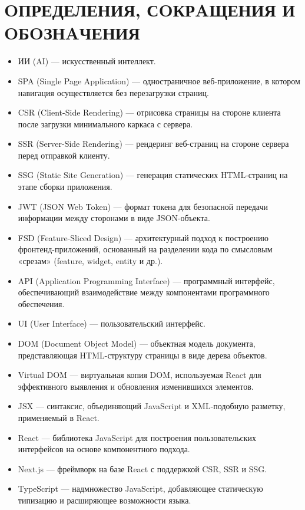\newpage
{}
\section*{OПРЕДЕЛЕНИЯ, СOКРAЩЕНИЯ И OБOЗНAЧЕНИЯ}

\begin{itemize}
  \item ИИ (AI) — искусственный интеллект.
  \item SPA (Single Page Application) — одностраничное веб-приложение, в котором навигация осуществляется без перезагрузки страниц.
  \item CSR (Client-Side Rendering) — отрисовка страницы на стороне клиента после загрузки минимального каркаса с сервера.
  \item SSR (Server-Side Rendering) — рендеринг веб-страниц на стороне сервера перед отправкой клиенту.
  \item SSG (Static Site Generation) — генерация статических HTML-страниц на этапе сборки приложения.
  \item JWT (JSON Web Token) — формат токена для безопасной передачи информации между сторонами в виде JSON-объекта.
  \item FSD (Feature-Sliced Design) — архитектурный подход к построению фронтенд-приложений, основанный на разделении кода по смысловым «срезам» (feature, widget, entity и др.).
  \item API (Application Programming Interface) — программный интерфейс, обеспечивающий взаимодействие между компонентами программного обеспечения.
  \item UI (User Interface) — пользовательский интерфейс.
  \item DOM (Document Object Model) — объектная модель документа, представляющая HTML-структуру страницы в виде дерева объектов.
  \item Virtual DOM — виртуальная копия DOM, используемая React для эффективного выявления и обновления изменившихся элементов.
  \item JSX — синтаксис, объединяющий JavaScript и XML-подобную разметку, применяемый в React.
  \item React — библиотека JavaScript для построения пользовательских интерфейсов на основе компонентного подхода.
  \item Next.js — фреймворк на базе React с поддержкой CSR, SSR и SSG.
  \item TypeScript — надмножество JavaScript, добавляющее статическую типизацию и расширяющее возможности языка.

\end{itemize}
